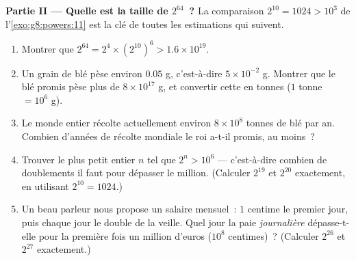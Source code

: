 \begin{problem}[{Devoir maison --- la \omterm{def:g1:addition:def}{somme} géométrique
$1 + 2 + 4 + \dots + 2^{n-1} = 2^n - 1$, d'une légende célèbre
jusqu'aux nombres binaires}]
\medskip
\noindent\textbf{Partie II --- Quelle est la taille de $2^{64}$~?}
La comparaison $2^{10} = 1024 > 10^3$ de
l'\cref{exo:g8:powers:11} est la clé de toutes les estimations qui
suivent.
\begin{enumerate}[resume]
  \item Montrer que
        $2^{64} = 2^4 \times \left(2^{10}\right)^6 > 1.6 \times
        10^{19}$.
  \item Un grain de blé pèse environ $0.05$ g, c'est-à-dire
        $5 \times 10^{-2}$ g. Montrer que le blé promis pèse plus de
        $8 \times 10^{17}$ g, et convertir cette  en tonnes
        ($1$ tonne $= 10^6$ g).
  \item Le monde entier récolte actuellement environ
        $8 \times 10^8$ tonnes de blé par an. Combien d'années de
        récolte mondiale le roi a-t-il promis, au moins~?
  \item Trouver le plus petit entier $n$ tel que $2^n > 10^6$ ---
        c'est-à-dire combien de doublements il faut pour dépasser le
        million. (Calculer $2^{19}$ et $2^{20}$ exactement, en
        utilisant $2^{10} = 1024$.)
  \item Un beau parleur nous propose un salaire mensuel~: $1$
        centime le premier jour, puis chaque jour le double de la
        veille. Quel jour la paie \emph{journalière} dépasse-t-elle
        pour la première fois un million d'euros ($10^8$
        centimes)~? (Calculer $2^{26}$ et $2^{27}$ exactement.)
\end{enumerate}


\end{problem}
